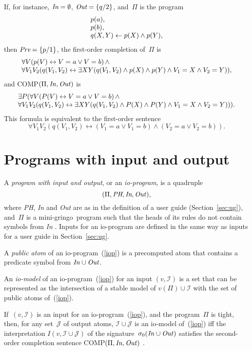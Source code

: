 \documentclass{new_tlp}
\def\ar{\leftarrow}
\def\lrar{\leftrightarrow}
\def\beq{\begin{equation}}
\def\eeq#1{\label{#1}\end{equation}}
\def\ba{\begin{array}}
\def\ea{\end{array}}
\def\gringo{{\sc gringo}}
\newcommand{\I}{\mathcal{I}}
\newcommand{\J}{\mathcal{J}}
\begin{document}
If, for instance, $\emph{In}=\emptyset$, $\emph{Out}=\{q/2\}$, and~$\Pi$
is the program
$$
\ba l
p(a),\\
p(b),\\
q(X,Y) \ar p(X) \land p(Y),
\ea$$
then $\emph{Prv}=\{p/1\}$,
the first-order completion of~$\Pi$ is
$$\ba l
\forall V(p(V) \lrar V=a \lor V=b)\,\land\\
\forall V_1V_2(q(V_1,V_2) \lrar \exists XY(q(V_1,V_2) \land p(X) \land p(Y)
\land V_1=X \land V_2=Y)),
\ea$$
and COMP$(\Pi,\emph{In\/},\emph{Out\/})$ is
$$
\ba l
\exists P(\forall V(P(V) \lrar V=a \lor V=b)\,\land\\
\forall V_1V_2(q(V_1,V_2) \lrar \exists XY(q(V_1,V_2) \land
P(X) \land P(Y) \land V_1=X \land V_2=Y))).
\ea
$$
This formula is equivalent to the first-order sentence
$$
\forall V_1V_2(q(V_1,V_2) \lrar (V_1=a \lor V_1=b)\land(V_2=a \lor V_2=b)).
$$

\section{Programs with input and output} \label{appc}

A \emph{program with input and output}, or an \emph{io-program},
is a quadruple
\beq
(\Pi,\emph{PH},\emph{In},\emph{Out\/}),
\eeq{iop}
where \emph{PH}, \emph{In} and \emph{Out} are as in the definition of
a user guide (Section~\ref{sec:ug}), and~$\Pi$ is a mini-\gringo\ program
such that the heads of its rules do not contain symbols from \emph{In}
\cite[Section~5.1]{fan20}.  Inputs for an io-program are defined in the same
way as inputs for a user guide in Section~\ref{sec:ug}.

A \emph{public atom} of an io-program~(\ref{iop}) is a precomputed atom
that contains a predicate symbol from $\emph{In\/}\cup\emph{Out\/}$.

An \emph{io-model} of an io-program~(\ref{iop}) for an input $(v,\I)$ is
a set that can be represented as the intersection of a stable model
of $v(\Pi)\cup\I$ with the set of public atoms of~(\ref{iop}).

If~$(v,\I)$ is an input for an io-program~(\ref{iop}), and the program~$\Pi$
is tight, then, for any set~$\J$ of output atoms, $\I\cup\J$ is an io-model
of~(\ref{iop}) iff the interpretation $I(v,\I\cup\J)$ of the
signature~$\sigma_0(\emph{In\/}\cup\emph{Out\/})$ satisfies the
second-order completion sentence COMP$(\Pi,\emph{In\/},\emph{Out\/})$
\cite[Theorem~2]{fan20}.
\end{document}
